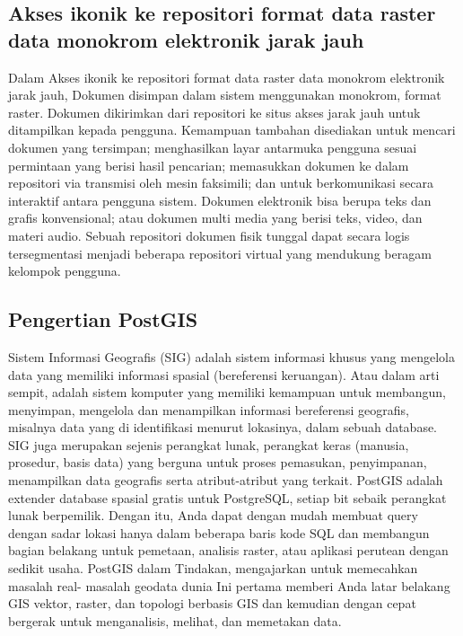 \subsection{Akses ikonik ke repositori format data raster data monokrom elektronik jarak jauh}
Dalam Akses ikonik ke repositori format data raster data monokrom elektronik jarak jauh, 
Dokumen disimpan dalam sistem menggunakan monokrom, format raster. 
Dokumen dikirimkan dari repositori ke situs akses jarak jauh untuk ditampilkan kepada pengguna. 
Kemampuan tambahan disediakan untuk mencari dokumen yang tersimpan; 
menghasilkan layar antarmuka pengguna sesuai permintaan yang berisi hasil pencarian; 
memasukkan dokumen ke dalam repositori via transmisi oleh mesin faksimili; 
dan untuk berkomunikasi secara interaktif antara pengguna sistem. 
Dokumen elektronik bisa berupa teks dan grafis konvensional; 
atau dokumen multi media yang berisi teks, video, dan materi audio. 
Sebuah repositori dokumen fisik tunggal dapat secara logis tersegmentasi menjadi
beberapa repositori virtual yang mendukung beragam kelompok pengguna.

\subsection{Pengertian PostGIS}
Sistem Informasi Geografis (SIG) adalah sistem informasi khusus yang mengelola data yang memiliki informasi spasial (bereferensi keruangan). 
Atau dalam arti sempit, adalah sistem komputer yang memiliki kemampuan untuk membangun,
menyimpan, mengelola dan menampilkan informasi bereferensi geografis, misalnya data yang di identifikasi menurut lokasinya, dalam sebuah database.
SIG juga merupakan sejenis perangkat lunak, perangkat keras (manusia, prosedur, basis data) yang berguna untuk proses pemasukan, penyimpanan, menampilkan data geografis serta atribut-atribut yang terkait.
PostGIS adalah extender database spasial gratis untuk PostgreSQL, 
setiap bit sebaik perangkat lunak berpemilik. Dengan itu, 
Anda dapat dengan mudah membuat query dengan sadar lokasi hanya dalam beberapa baris kode SQL 
dan membangun bagian belakang untuk pemetaan, analisis raster, 
atau aplikasi perutean dengan sedikit usaha. 
PostGIS dalam Tindakan, mengajarkan untuk memecahkan masalah real- 
masalah geodata dunia Ini pertama memberi Anda latar belakang GIS vektor,
raster, dan topologi berbasis GIS dan kemudian dengan cepat bergerak 
untuk menganalisis, melihat, dan memetakan data.


